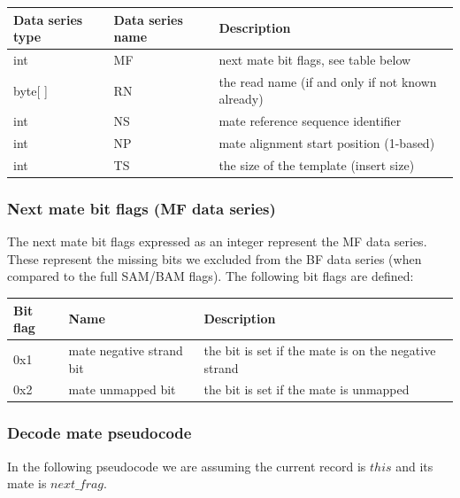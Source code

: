 \documentclass[a4paper]{article}
\begin{document}
\begin{tabular}{|>{\raggedright}p{66pt}|>{\raggedright}p{117pt}|>{\raggedright}p{228pt}|}
\hline
\textbf{Data series type} & \textbf{Data series name} & \textbf{Description}\tabularnewline
\hline
int & MF & next mate bit flags, see table below\tabularnewline
\hline
byte[ ] & RN & the read name (if and only if not known already)\tabularnewline
\hline
int & NS & mate reference sequence identifier \tabularnewline
\hline
int & NP & mate alignment start position (1-based)\tabularnewline
\hline
int & TS & the size of the template (insert size)\tabularnewline
\hline
\end{tabular}

\subsubsection*{Next mate bit flags (MF data series)}

The next mate bit flags expressed as an integer represent the MF data series.
These represent the missing bits we excluded from the BF data series (when compared to the full SAM/BAM flags).
The following bit flags are defined:

\begin{tabular}{|>{\raggedright}p{47pt}|>{\raggedright}p{134pt}|>{\raggedright}p{250pt}|}
\hline
\textbf{Bit flag} & \textbf{Name} & \textbf{Description}\tabularnewline
\hline
0x1 & mate negative strand bit & the bit is set if the mate is on the negative
strand\tabularnewline
\hline
0x2 & mate unmapped bit & the bit is set if the mate is unmapped\tabularnewline
\hline
\end{tabular}


\subsubsection*{\textbf{Decode mate pseudocode}}

In the following pseudocode we are assuming the current record is $this$ and its mate is $next\_frag$.
\end{document}
